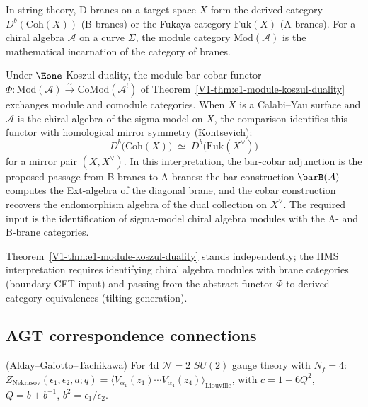 \begin{remark}
\label{rem:hms-koszul}
In string theory, D-branes on a target space $X$ form the derived category
$D^b(\mathrm{Coh}(X))$ (B-branes) or the Fukaya category $\mathrm{Fuk}(X)$
(A-branes). For a chiral algebra $\mathcal{A}$ on a curve $\Sigma$, the
module category $\mathrm{Mod}(\mathcal{A})$ is the mathematical incarnation
of the category of branes.

Under $\Eone$-Koszul duality, the module bar-cobar functor
$\Phi\colon \mathrm{Mod}(\mathcal{A}) \xrightarrow{\sim}
\mathrm{CoMod}(\mathcal{A}^!)$
of Theorem~\ref*{V1-thm:e1-module-koszul-duality} exchanges module and comodule
categories. When $X$ is a Calabi--Yau surface and $\mathcal{A}$ is the chiral
algebra of the sigma model on $X$, the comparison identifies this
functor with homological mirror symmetry (Kontsevich):
\[
D^b\bigl(\mathrm{Coh}(X)\bigr)
\;\simeq\;
D^b\bigl(\mathrm{Fuk}(X^\vee)\bigr)
\]
for a mirror pair $(X, X^\vee)$. In this interpretation, the bar-cobar
adjunction is the proposed passage from B-branes to A-branes: the bar construction
$\barB(\mathcal{A})$ computes the Ext-algebra of the diagonal brane,
and the cobar construction recovers the endomorphism algebra of the dual
collection on $X^\vee$. The required input is the identification of
sigma-model chiral algebra modules with the A- and B-brane categories.
\end{remark}

\begin{remark}
Theorem~\ref*{V1-thm:e1-module-koszul-duality} stands independently; the HMS interpretation requires identifying chiral algebra modules with brane categories (boundary CFT input) and passing from the abstract functor $\Phi$ to derived category equivalences (tilting generation).
\end{remark}


\subsection{AGT correspondence connections}
\label{sec:agt}

\begin{theorem}\label{thm:agt}
(Alday--Gaiotto--Tachikawa) For 4d $\mathcal{N}=2$ $SU(2)$ gauge theory with $N_f=4$: $Z_{\mathrm{Nekrasov}}(\epsilon_1,\epsilon_2,a;q) = \langle V_{\alpha_1}(z_1)\cdots V_{\alpha_4}(z_4)\rangle_{\mathrm{Liouville}}$, with $c = 1+6Q^2$, $Q=b+b^{-1}$, $b^2=\epsilon_1/\epsilon_2$.
\end{theorem}

